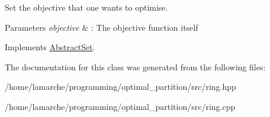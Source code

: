 Set the objective that one wants to optimise. 


\begin{DoxyParams}{Parameters}
{\em objective} & \-: The objective function itself \\
\hline
\end{DoxyParams}


Implements \hyperlink{classAbstractSet_a7aef71679a18ab7965d1098da15b26c2}{Abstract\-Set}.



The documentation for this class was generated from the following files\-:\begin{DoxyCompactItemize}
\item 
/home/lamarche/programming/optimal\-\_\-partition/src/ring.\-hpp\item 
/home/lamarche/programming/optimal\-\_\-partition/src/ring.\-cpp\end{DoxyCompactItemize}
